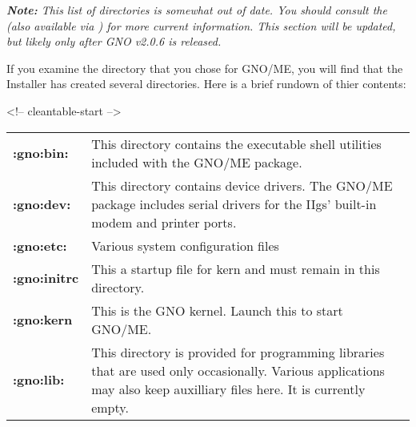 \documentclass{report}
\begin{document}
\em
\textbf{Note:}  This list of directories is somewhat out of date.
You should consult the  (also available via
) for more current information.
This section will be updated, but likely only after GNO v2.0.6 is 
released.
\rm

If you examine the directory that you chose
for GNO/ME, you will find that the Installer has created several
directories. Here is a brief rundown of thier contents:


\begin{rawhtml}
<!-- cleantable-start -->
\end{rawhtml}
\begin{tabular}{ll}

\bf :gno:bin: \rm	& 
\begin{minipage}[t]{8cm}
	This directory contains the executable shell utilities included
	with the GNO/ME package.
\end{minipage} \hfill \\


\bf :gno:dev: \rm	& 
\begin{minipage}[t]{8cm}
	This directory contains device drivers. The GNO/ME package
	includes serial drivers for the IIgs' built-in modem and
	printer ports.
\end{minipage} \hfill \\

\bf :gno:etc: \rm	& 
\begin{minipage}[t]{8cm}
	Various system configuration files
\end{minipage} \hfill \\

\bf :gno:initrc \rm	& 
\begin{minipage}[t]{8cm}
	This a startup file for kern and must remain in this directory.
\end{minipage} \hfill \\

\bf :gno:kern \rm	& 
\begin{minipage}[t]{8cm}
	This is the GNO kernel. Launch this to start GNO/ME.
\end{minipage} \hfill \\

\bf :gno:lib: \rm	& 
\begin{minipage}[t]{8cm}
	This directory is provided for programming libraries that are
	used only occasionally.  Various applications may also keep
	auxilliary files here.  It is currently empty.
\end{minipage} \hfill \\


\end{tabular}
\end{document}
